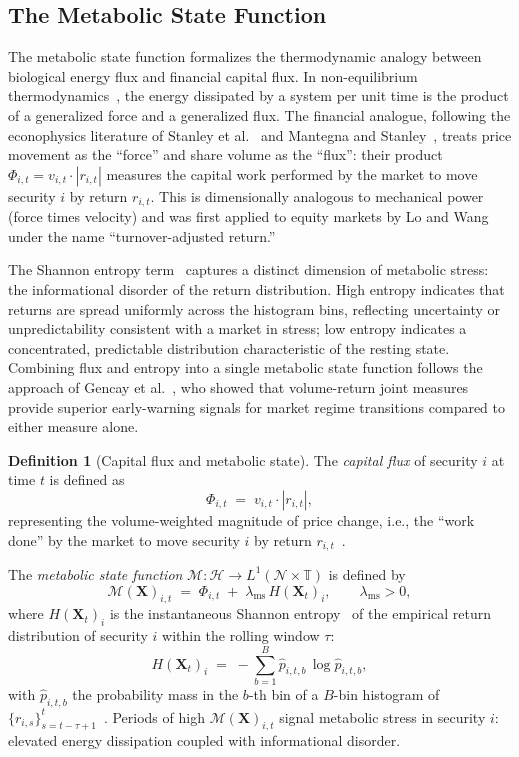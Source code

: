 \documentclass[11pt,a4paper]{article}  %
\newcommand{\Hilbert}{\mathcal{H}}
\newcommand{\Mop}{\mathcal{M}}
\newcommand{\abs}[1]{\left\lvert#1\right\rvert}
\theoremstyle{plain}
\theoremstyle{definition}
\newtheorem{definition}{Definition}[section]
\theoremstyle{remark}
\begin{document}
\subsection{The Metabolic State Function}
\label{subsec:metabolic}

The metabolic state function formalizes the thermodynamic analogy
between biological energy flux and financial capital flux. In
non-equilibrium thermodynamics~\cite{Prigogine1977}, the energy
dissipated by a system per unit time is the product of a generalized
force and a generalized flux. The financial analogue, following the
econophysics literature of Stanley et al.~\cite{Stanley1999} and
Mantegna and Stanley~\cite{MantegnaStanley1999}, treats price
movement as the ``force'' and share volume as the ``flux'': their
product $\Phi_{i,t} = v_{i,t}\cdot|r_{i,t}|$ measures the capital
work performed by the market to move security $i$ by return $r_{i,t}$.
This is dimensionally analogous to mechanical power (force times
velocity) and was first applied to equity markets by Lo and
Wang~\cite{LoWang2000} under the name ``turnover-adjusted return.''

The Shannon entropy term~\cite{Shannon1948} captures a distinct
dimension of metabolic stress: the informational disorder of the
return distribution. High entropy indicates that returns are
spread uniformly across the histogram bins, reflecting uncertainty
or unpredictability consistent with a market in stress; low entropy
indicates a concentrated, predictable distribution characteristic
of the resting state. Combining flux and entropy into a single
metabolic state function follows the approach of
Gencay et al.~\cite{Gencay2001}, who showed that volume-return
joint measures provide superior early-warning signals for market
regime transitions compared to either measure alone.

\begin{definition}[Capital flux and metabolic state]
\label{def:metabolic}
The \emph{capital flux} of security $i$ at time $t$ is defined as
\[
   \Phi_{i,t} \;=\; v_{i,t}\cdot\abs{r_{i,t}},
\]
representing the volume-weighted magnitude of price change, i.e.,
the ``work done'' by the market to move security $i$ by return
$r_{i,t}$~\cite{LoWang2000}.

The \emph{metabolic state function}
$\Mop:\Hilbert\to L^{1}(\mathcal{N}\times\mathbb{T})$ is defined by
\[
   \Mop(\mathbf{X})_{i,t} \;=\; \Phi_{i,t}\;+\;
   \lambda_{\mathrm{ms}}\,H\!\left(\mathbf{X}_t\right)_{i},
   \qquad \lambda_{\mathrm{ms}}>0,
\]
where $H(\mathbf{X}_t)_i$ is the instantaneous Shannon entropy~\cite{Shannon1948}
of the empirical return distribution of security $i$ within the
rolling window $\tau$:
\[
   H\!\left(\mathbf{X}_t\right)_{i}
   \;=\; -\sum_{b=1}^{B} \hat{p}_{i,t,b}\,\log \hat{p}_{i,t,b},
\]
with $\hat{p}_{i,t,b}$ the probability mass in the $b$-th bin of a
$B$-bin histogram of $\{r_{i,s}\}_{s=t-\tau+1}^{t}$~\cite{Silverman1986}.
Periods of high $\Mop(\mathbf{X})_{i,t}$ signal metabolic stress
in security $i$: elevated energy dissipation coupled with
informational disorder.
\end{definition}
\end{document}
